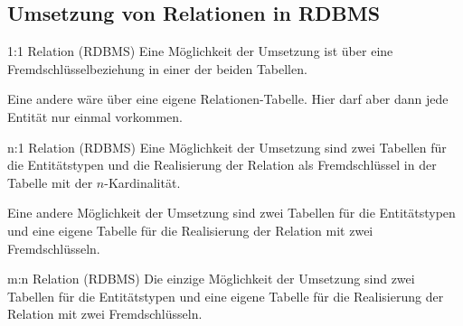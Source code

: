 \subsection{Umsetzung von Relationen in RDBMS}

\begin{bonus}{1:1 Relation (RDBMS)}
    Eine Möglichkeit der Umsetzung ist über eine Fremdschlüsselbeziehung in einer der beiden Tabellen.

    Eine andere wäre über eine eigene Relationen-Tabelle.
    Hier darf aber dann jede Entität nur einmal vorkommen.
\end{bonus}

\begin{bonus}{n:1 Relation (RDBMS)}
    Eine Möglichkeit der Umsetzung sind zwei Tabellen für die Entitätstypen und die Realisierung der Relation als Fremdschlüssel in der Tabelle mit der $n$-Kardinalität.

    Eine andere Möglichkeit der Umsetzung sind zwei Tabellen für die Entitätstypen und eine eigene Tabelle für die Realisierung der Relation mit zwei Fremdschlüsseln.
\end{bonus}

\begin{bonus}{m:n Relation (RDBMS)}
    Die einzige Möglichkeit der Umsetzung sind zwei Tabellen für die Entitätstypen und eine eigene Tabelle für die Realisierung der Relation mit zwei Fremdschlüsseln.
\end{bonus}